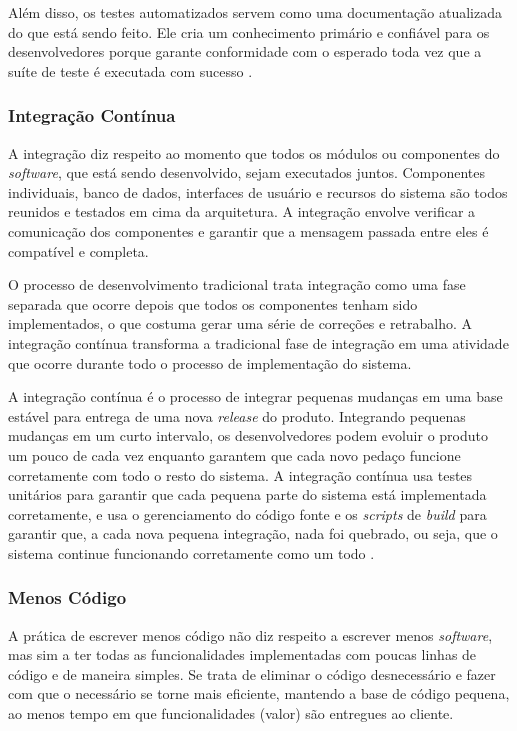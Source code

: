 Além disso, os testes automatizados servem como uma documentação atualizada do que está sendo feito. Ele cria um conhecimento primário e confiável para os desenvolvedores porque garante conformidade com o esperado toda vez que a suíte de teste é executada com sucesso \cite{hibbs2009}.

\subsubsection[Integração Contínua]{Integração Contínua}

A integração diz respeito ao momento que todos os módulos ou componentes do \textit{software}, que está sendo desenvolvido, sejam executados juntos. Componentes individuais, banco de dados, interfaces de usuário e recursos do sistema são todos reunidos e testados em cima da arquitetura. A integração envolve verificar a comunicação dos componentes e garantir que a mensagem passada entre eles é compatível e completa. 

O processo de desenvolvimento tradicional trata integração como uma fase separada que ocorre depois que todos os componentes tenham sido implementados, o que costuma gerar uma série de correções e retrabalho. A integração contínua transforma a tradicional fase de integração em uma atividade que ocorre durante todo o processo de implementação do sistema.

A integração contínua é o processo de integrar pequenas mudanças em uma base estável para entrega de uma nova \textit{release} do produto. Integrando pequenas mudanças em um curto intervalo, os desenvolvedores podem evoluir o produto um pouco de cada vez enquanto garantem que cada novo pedaço funcione corretamente com todo o resto do sistema. A integração contínua usa testes unitários para garantir que cada pequena parte do sistema está implementada corretamente, e usa o gerenciamento do código fonte e os \textit{scripts} de \textit{build} para garantir que, a cada nova pequena integração, nada foi quebrado, ou seja, que o sistema continue funcionando corretamente como um todo \cite{hibbs2009}. 

\subsubsection[Menos Código ]{Menos Código}

A prática de escrever menos código não diz respeito a escrever menos \textit{software}, mas sim a ter todas as funcionalidades implementadas com poucas linhas de código e de maneira simples. Se trata de eliminar o código desnecessário e fazer com que o necessário se torne mais eficiente, mantendo a base de código pequena, ao menos tempo em que funcionalidades (valor) são entregues ao cliente.

